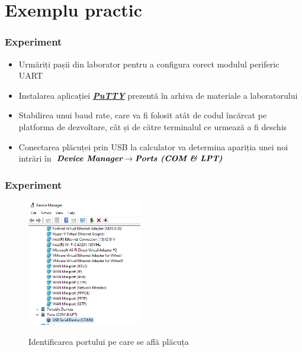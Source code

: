 \documentclass[xcolor={table}]{beamer}
\begin{document}
        \section{Exemplu practic}
        \begin{frame}
                \frametitle{Experiment}
                \begin{itemize}
                    \item Urmăriți pașii din laborator pentru a configura corect modulul periferic UART
                    \item Instalarea aplicației \href{https://wiki.mta.ro/_media/c/4/ssmp/environment_setup.7z}{\textbf{\textit{PuTTY}}} prezentă în arhiva de materiale a laboratorului
                    \item Stabilirea unui baud rate, care va fi folosit atât de codul încărcat pe platforma de dezvoltare, cât și de către terminalul ce urmează a fi deschis
                    \item Conectarea plăcuței prin USB la calculator va determina apariția unei noi intrări în $\textit{\textbf{Device Manager}} \rightarrow \textbf{\textit{Ports (COM \& LPT)}}$
                \end{itemize}
        \end{frame}
        \begin{frame}
                \frametitle{Experiment}
                \begin{figure}
                    \centering
                    \includegraphics[width=5cm]{images/device.png}
                    \label{ceva}
                    \caption{ Identificarea portului pe care se află plăcuța}
                \end{figure}
        \end{frame}
\end{document}

